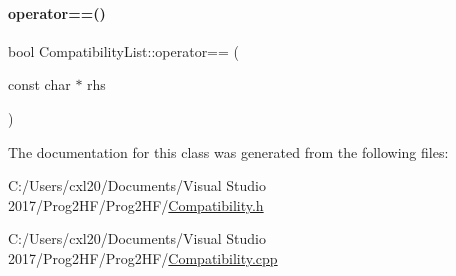\mbox{\label{class_compatibility_list_ad476ceb7026c6316112d5f11b283357e}} 
\paragraph{\texorpdfstring{operator==()}{operator==()}\hspace{0.1cm}{\footnotesize\ttfamily [2/2]}}
{\footnotesize\ttfamily bool Compatibility\+List\+::operator== (\begin{DoxyParamCaption}\item[{const char $\ast$}]{rhs }\end{DoxyParamCaption})\hspace{0.3cm}{\ttfamily [inline]}}



The documentation for this class was generated from the following files\+:\begin{DoxyCompactItemize}
\item 
C\+:/\+Users/cxl20/\+Documents/\+Visual Studio 2017/\+Prog2\+H\+F/\+Prog2\+H\+F/\mbox{\hyperlink{_compatibility_8h}{Compatibility.\+h}}\item 
C\+:/\+Users/cxl20/\+Documents/\+Visual Studio 2017/\+Prog2\+H\+F/\+Prog2\+H\+F/\mbox{\hyperlink{_compatibility_8cpp}{Compatibility.\+cpp}}\end{DoxyCompactItemize}
